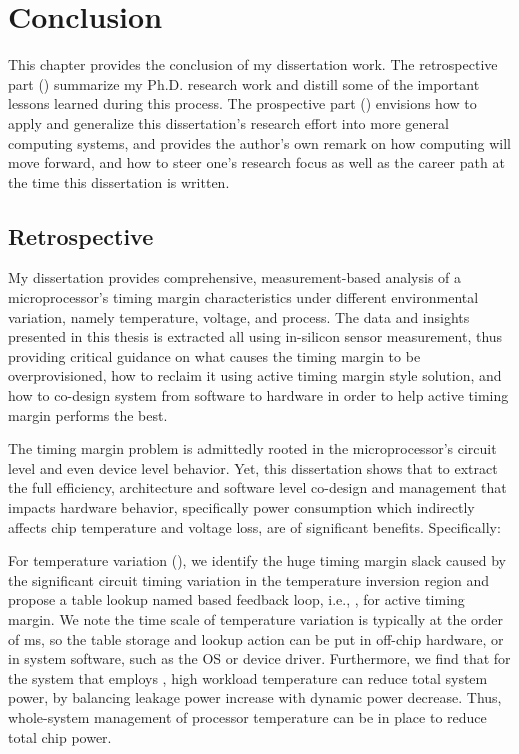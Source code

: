 
\chapter{Conclusion}
\label{sec:conc}

This chapter provides the conclusion of my dissertation work. The retrospective part () summarize my Ph.D. research work and distill some of the important lessons learned during this process. The prospective part () envisions how to apply and generalize this dissertation's research effort into more general computing systems, and provides the author's own remark on how computing will move forward, and how to steer one's research focus as well as the career path at the time this dissertation is written.

\section{Retrospective}
\label{sec:conc:retro}

My dissertation provides comprehensive, measurement-based analysis of a microprocessor's timing margin characteristics under different environmental variation, namely temperature, voltage, and process. The data and insights presented in this thesis is extracted all using in-silicon sensor measurement, thus providing critical guidance on what causes the timing margin to be overprovisioned, how to reclaim it using active timing margin style solution, and how to co-design system from software to hardware in order to help active timing margin performs the best.

The timing margin problem is admittedly rooted in the microprocessor's circuit level and even device level behavior. Yet, this dissertation shows that to extract the full efficiency, architecture and software level co-design and management that impacts hardware behavior, specifically power consumption which indirectly affects chip temperature and voltage loss, are of significant benefits. Specifically:

For temperature variation (), we identify the huge timing margin slack caused by the significant circuit timing variation in the temperature inversion region and propose a table lookup named based feedback loop, i.e., \tistates, for active timing margin. We note the time scale of temperature variation is typically at the order of ms, so the table storage and lookup action can be put in off-chip hardware, or in system software, such as the OS or device driver. Furthermore, we find that for the system that employs \tistates, high workload temperature can reduce total system power, by balancing leakage power increase with dynamic power decrease. Thus, whole-system management of processor temperature can be in place to reduce total chip power.

